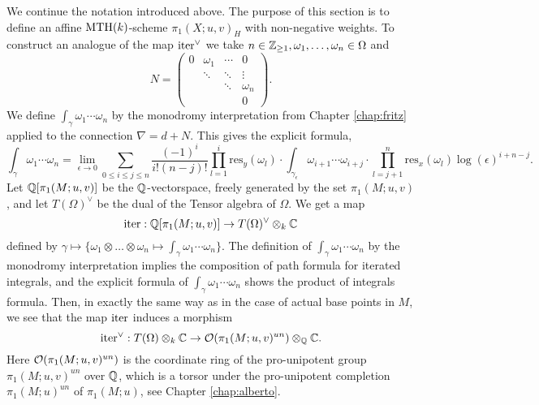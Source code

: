 We continue the notation introduced above. The purpose of this section is to define an affine $\mathrm{MTH}(k)$-scheme $\pi_1(X;u,v)_H$ with non-negative weights. To construct an analogue of the map $\mathrm{iter}^{\vee}$ we take $n\in\mathbb{Z}_{\geq 1}, \omega_1, \ldots, \omega_n \in \Omega$
and
$$
N = \left( \begin{array}{cccc}
0 & \omega_1 & \cdots & 0 \\
 & \ddots & \ddots &  \vdots \\
 & &  \ddots & \omega_n \\
 & &     & 0
\end{array}
\right).
$$
We define $\int_{\gamma} \omega_1 \cdots \omega_n$ by the monodromy interpretation from Chapter \ref{chap:fritz} applied to the connection $\nabla=d+N$. This gives the explicit formula,
$$
\int_{\gamma} \omega_1 \cdots \omega_n = \lim_{\epsilon \to 0} \sum_{0 \leq i \leq j \leq n} \frac{(-1)^i}{i!(n-j)!} \prod_{l=1}^i \mathrm{res}_y(\omega_l) \cdot \int_{\gamma_{\epsilon}} \omega_{i+1} \cdots \omega_{i+j} \cdot \prod_{l=j+1}^n \mathrm{res}_x(\omega_l) \log(\epsilon)^{i+n-j}.
$$
Let $\mathbb{Q}[\pi_1(M;u,v)]$ be the $\mathbb{Q}$-vectorspace, freely generated by the set $\pi_1(M;u,v)$, and let $T(\Omega)^\vee$ be the dual of the Tensor algebra of $\Omega$. 
We get a map
$$\mathrm{iter}: \mathbb{Q}[\pi_1(M;u,v)]\to T(\Omega)^\vee\otimes_k\mathbb{C}$$
defined by $\gamma\mapsto \{\omega_1\otimes\dotsc\otimes\omega_n\mapsto\int_\gamma \omega_1\cdots\omega_n\}$. 
The definition of $\int_\gamma \omega_1\cdots\omega_n$  by the monodromy interpretation implies the composition of path formula for iterated integrals, and the explicit formula of $\int_\gamma \omega_1\cdots\omega_n$ shows the product of integrals formula. 
Then, in exactly the same way as in the case of actual base points in $M$, we see that the map $\mathrm{iter}$ induces a morphism
$$\mathrm{iter}^\vee:  T(\Omega)\otimes_k\mathbb{C}\to \mathcal{O}(\pi_1(M;u,v)^{un})\otimes_{\mathbb{Q}}\mathbb{C}.$$
Here $\mathcal{O}(\pi_1(M;u,v)^{un})$ is the coordinate ring of the pro-unipotent group $\pi_1(M;u,v)^{un}$ over $\mathbb{Q}$, which is a torsor under the pro-unipotent completion $\pi_1(M;u)^{un}$ of $\pi_1(M;u)$, see Chapter \ref{chap:alberto}. 

